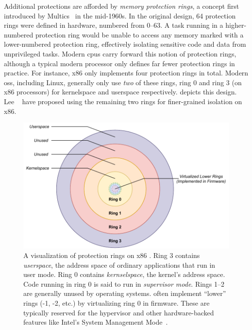 \documentclass[
  fontsize=12pt,
  titlepage=firstiscover,
  paper=letter,
oneside,
  cleardoublepage=plain,
  parskip=half-,
  DIV=10,
  parindent,
  appendixprefix,
  chapterprefix,
  listof=totoc,
]{scrbook}
\begin{document}
Additional protections are afforded by \textit{memory protection rings}, a concept first
introduced by Multics~\cite{vyssotsky1965_multics, corbato1965_multics} in the mid-1960s.
In the original design, 64 protection rings were defined in hardware, numbered from 0--63.
A task running in a higher-numbered protection ring would be unable to access any memory
marked with a lower-numbered protection ring, effectively isolating sensitive code and
data from unprivileged tasks. Modern \glspl{cpu} carry forward this notion of protection
rings, although a typical modern processor only defines far fewer protection rings in
practice. For instance, x86 only implements four protection rings in total. Modern
\gls{os}s, including Linux, generally only use \textit{two} of these rings, ring 0 and
ring 3 (on x86 processors) for kernelspace and userspace respectively.  
depicts this design. Lee \etal~\cite{lee2018_lotr} have proposed using the remaining two
rings for finer-grained isolation on x86.

\begin{figure}[htbp]
  \centering
  \includegraphics[width=0.8\linewidth]{figs/background/rings.pdf}
  \caption[Protection rings on modern ]{
    A visualization of protection rings on x86 . Ring 3 contains
    \textit{userspace}, the address space of ordinary applications that run in user mode.
    Ring 0 contains \textit{kernselspace}, the kernel's address space. Code running in
    ring 0 is said to run in \textit{supervisor mode}. Rings 1--2 are generally unused by
     operating systems.  often implement \enquote{lower}
    rings (-1, -2, etc.) by virtualizing ring 0 in firmware. These are typically reserved
    for the hypervisor and other hardware-backed features like Intel's System Management
    Mode~\cite{tereshkin2009_introducing}.
  }\label{fig:rings}
\end{figure}
\end{document}
